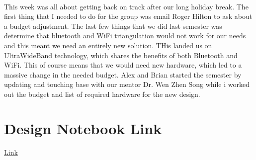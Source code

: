 \documentclass[11pt]{report}
\begin{document}
	\paragraph*{}
		This week was all about getting back on track after our long holiday break. The first thing that I needed to do for the group was email Roger Hilton to ask about a budget adjustment. The last few things that we did last semester was determine that bluetooth and WiFi triangulation would not work for our needs and this meant we need an entirely new solution. THis landed us on UltraWideBand technology, which shares the benefits of both Bluetooth and WiFi. This of course means that we would need new hardware, which led to a massive change in the needed budget.  Alex and Brian started the semester by updating and touching base with our mentor Dr. Wen Zhen Song while i worked out the budget and list of required hardware for the new design.

\section*{Design Notebook Link}
	\begin{center}
		\href{https://docs.google.com/document/d/1_15R62LK1jZ8SYRuCrb-5IObISIdbLSfoH2bRU7464c/edit?usp=sharing}{Link}
	\end{center}
\end{document}
